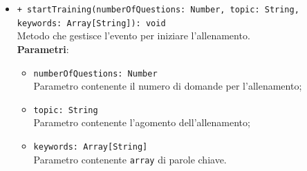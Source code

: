 \begin{itemize}
\begin{itemize}
\begin{itemize}
			\end{itemize}
			\item \texttt{+ startTraining(numberOfQuestions: Number, topic: String, \\keywords: Array[String]): void} \\
			Metodo che gestisce l'evento per iniziare l'allenamento. \\
			\textbf{Parametri}:
			\begin{itemize}
				\item \texttt{numberOfQuestions: Number} \\
				Parametro contenente il numero di domande per l'allenamento;
				\item \texttt{topic: String} \\
				Parametro contenente l'agomento dell'allenamento;
				\item \texttt{keywords: Array[String]} \\
				Parametro contenente \texttt{array} di parole chiave.
			\end{itemize}
		\end{itemize}
	\end{itemize}
	
	